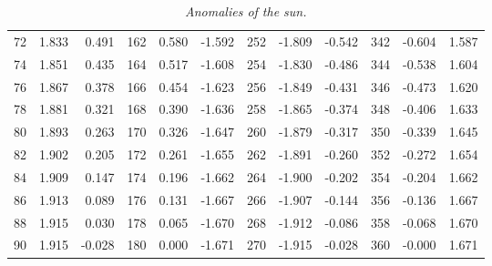 \begin{table}
{\begin{tabular}{rrr|rrr|rrr|rrr}
 72 &  1.833 &  0.491 & 162 &  0.580 & -1.592 & 252 & -1.809 & -0.542 & 342 & -0.604 &  1.587\\
 74 &  1.851 &  0.435 & 164 &  0.517 & -1.608 & 254 & -1.830 & -0.486 & 344 & -0.538 &  1.604\\
 76 &  1.867 &  0.378 & 166 &  0.454 & -1.623 & 256 & -1.849 & -0.431 & 346 & -0.473 &  1.620\\
 78 &  1.881 &  0.321 & 168 &  0.390 & -1.636 & 258 & -1.865 & -0.374 & 348 & -0.406 &  1.633\\
 80 &  1.893 &  0.263 & 170 &  0.326 & -1.647 & 260 & -1.879 & -0.317 & 350 & -0.339 &  1.645\\
 82 &  1.902 &  0.205 & 172 &  0.261 & -1.655 & 262 & -1.891 & -0.260 & 352 & -0.272 &  1.654\\
 84 &  1.909 &  0.147 & 174 &  0.196 & -1.662 & 264 & -1.900 & -0.202 & 354 & -0.204 &  1.662\\
 86 &  1.913 &  0.089 & 176 &  0.131 & -1.667 & 266 & -1.907 & -0.144 & 356 & -0.136 &  1.667\\
 88 &  1.915 &  0.030 & 178 &  0.065 & -1.670 & 268 & -1.912 & -0.086 & 358 & -0.068 &  1.670\\
 90 &  1.915 & -0.028 & 180 &  0.000 & -1.671 & 270 & -1.915 & -0.028 & 360 & -0.000 &  1.671\\ 
\end{tabular}}
\caption{\em Anomalies of the sun.}\label{lt6}
\end{table}

